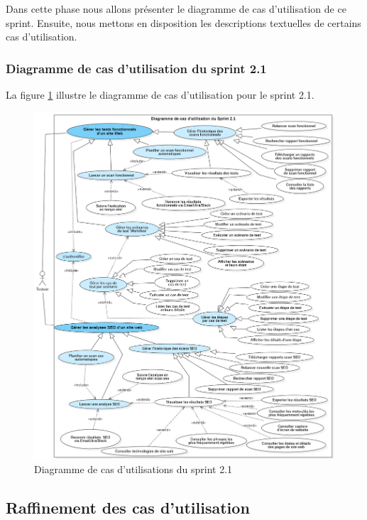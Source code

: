 Dans cette phase nous allons présenter le diagramme de cas d’utilisation de ce sprint. Ensuite, nous mettons en disposition les descriptions textuelles de certains cas d’utilisation.
\subsubsection{ Diagramme de cas d’utilisation du sprint 2.1}
    La figure \ref{fig:caseS21} illustre le diagramme de cas d’utilisation pour le sprint 2.1.
        \begin{figure}[H]
            \centering
            \includegraphics[width=\linewidth]{chapitres/ch4Sp2/section/sprint2.1/img/LastUseCaseSprint2.1.png}
            \caption{Diagramme de cas d'utilisations du sprint 2.1}
            \label{fig:caseS21}
        \end{figure}
\subsection{Raffinement des cas d'utilisation}
